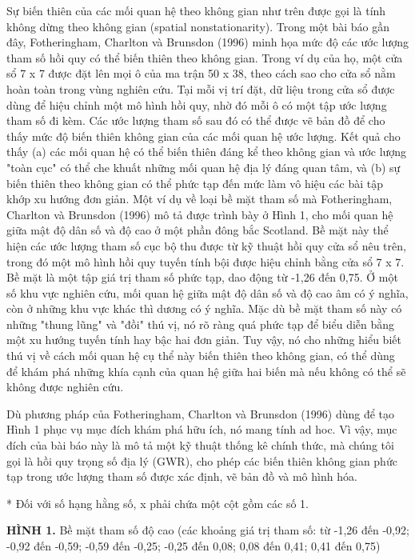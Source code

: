 Sự biến thiên của các mối quan hệ theo không gian như trên được gọi là tính không dừng theo không gian (spatial nonstationarity). Trong một bài báo gần đây, Fotheringham, Charlton và Brunsdon (1996) minh họa mức độ các ước lượng tham số hồi quy có thể biến thiên theo không gian. Trong ví dụ của họ, một cửa sổ 7 x 7 được đặt lên mọi ô của ma trận 50 x 38, theo cách sao cho cửa sổ nằm hoàn toàn trong vùng nghiên cứu. Tại mỗi vị trí đặt, dữ liệu trong cửa sổ được dùng để hiệu chỉnh một mô hình hồi quy, nhờ đó mỗi ô có một tập ước lượng tham số đi kèm. Các ước lượng tham số sau đó có thể được vẽ bản đồ để cho thấy mức độ biến thiên không gian của các mối quan hệ ước lượng. Kết quả cho thấy (a) các mối quan hệ có thể biến thiên đáng kể theo không gian và ước lượng "toàn cục" có thể che khuất những mối quan hệ địa lý đáng quan tâm, và (b) sự biến thiên theo không gian có thể phức tạp đến mức làm vô hiệu các bài tập khớp xu hướng đơn giản. Một ví dụ về loại bề mặt tham số mà Fotheringham, Charlton và Brunsdon (1996) mô tả được trình bày ở Hình 1, cho mối quan hệ giữa mật độ dân số và độ cao ở một phần đông bắc Scotland. Bề mặt này thể hiện các ước lượng tham số cục bộ thu được từ kỹ thuật hồi quy cửa sổ nêu trên, trong đó một mô hình hồi quy tuyến tính bội được hiệu chỉnh bằng cửa sổ 7 x 7. Bề mặt là một tập giá trị tham số phức tạp, dao động từ -1,26 đến 0,75. Ở một số khu vực nghiên cứu, mối quan hệ giữa mật độ dân số và độ cao âm có ý nghĩa, còn ở những khu vực khác thì dương có ý nghĩa. Mặc dù bề mặt tham số này có những "thung lũng" và "đồi" thú vị, nó rõ ràng quá phức tạp để biểu diễn bằng một xu hướng tuyến tính hay bậc hai đơn giản. Tuy vậy, nó cho những hiểu biết thú vị về cách mối quan hệ cụ thể này biến thiên theo không gian, có thể dùng để khám phá những khía cạnh của quan hệ giữa hai biến mà nếu không có thể sẽ không được nghiên cứu.

Dù phương pháp của Fotheringham, Charlton và Brunsdon (1996) dùng để tạo Hình 1 phục vụ mục đích khám phá hữu ích, nó mang tính ad hoc. Vì vậy, mục đích của bài báo này là mô tả một kỹ thuật thống kê chính thức, mà chúng tôi gọi là hồi quy trọng số địa lý (GWR), cho phép các biến thiên không gian phức tạp trong ước lượng tham số được xác định, vẽ bản đồ và mô hình hóa.

* Đối với số hạng hằng số, x phải chứa một cột gồm các số 1.

\textbf{HÌNH 1.} Bề mặt tham số độ cao (các khoảng giá trị tham số: từ -1,26 đến -0,92; -0,92 đến -0,59; -0,59 đến -0,25; -0,25 đến 0,08; 0,08 đến 0,41; 0,41 đến 0,75)

